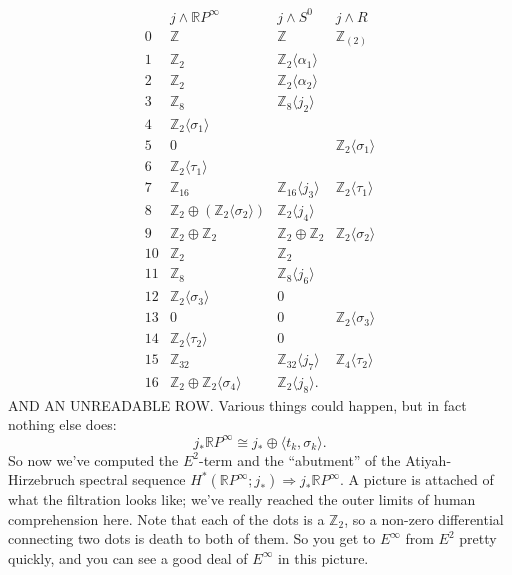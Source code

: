 \documentclass{article}
\newcommand{\Z}{\mathbb{Z}}
\newcommand{\R}{\mathbb{R}}
\newcommand{\RP}{\R P}
\newcommand{\sprod}{\wedge}
\theoremstyle{definition}
\begin{document}
\[
\begin{array}{cccc}
& j \sprod \RP^\infty & j \sprod S^0 & j \sprod R \\
0 & \Z & \Z & \Z_{(2)} \\
1 & \Z_2 & \Z_2 \langle \alpha_1 \rangle \\
2 & \Z_2 & \Z_2 \langle \alpha_2 \rangle \\
3 & \Z_8 & \Z_8 \langle j_2 \rangle \\
4 & \Z_2 \langle \sigma_1 \rangle \\
5 & 0 & & \Z_2 \langle \sigma_1 \rangle \\
6 & \Z_2 \langle \tau_1 \rangle \\
7 & \Z_{16} & \Z_{16} \langle j_3 \rangle & \Z_2 \langle \tau_1 \rangle \\
8 & \Z_2 \oplus (\Z_2 \langle \sigma_2 \rangle) & \Z_2 \langle j_4 \rangle \\
9 & \Z_2 \oplus \Z_2 & \Z_2 \oplus \Z_2 & \Z_2 \langle \sigma_2 \rangle \\
10 & \Z_2 & \Z_2 \\
11 & \Z_8 & \Z_8 \langle j_6 \rangle \\
12 & \Z_2 \langle \sigma_3 \rangle & 0 \\
13 & 0 & 0 & \Z_2 \langle \sigma_3 \rangle \\
14 & \Z_2 \langle \tau_2 \rangle  & 0 \\
15 & \Z_{32} & \Z_{32} \langle j_7 \rangle & \Z_4 \langle \tau_2 \rangle \\
16 & \Z_2 \oplus \Z_2 \langle \sigma_4 \rangle & \Z_2 \langle j_8 \rangle.
\end{array}
\]
AND AN UNREADABLE ROW.  Various things could happen, but in fact nothing else does:
\[
j_* \RP^\infty \cong j_* \oplus \langle t_k, \sigma_k \rangle.
\]
So now we've computed the $E^2$-term and the ``abutment'' of the Atiyah-Hirzebruch spectral sequence $H^*(\RP^\infty; j_*) \Rightarrow j_* \RP^\infty$.  A picture is attached of what the filtration looks like; we've really reached the outer limits of human comprehension here.  Note that each of the dots is a $\Z_2$, so a non-zero differential connecting two dots is death to both of them.  So you get to $E^\infty$ from $E^2$ pretty quickly, and you can see a good deal of $E^\infty$ in this picture.
\end{document}
